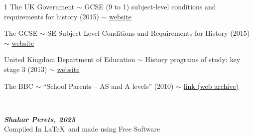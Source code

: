 \documentclass[12pt]{article}
\begin{document}
\begin{thebibliography}{1}
		 The UK Government $\sim$ GCSE (9 to 1) subject-level conditions and requirements for history (2015) $\sim$ \href{https://www.gov.uk/government/publications/gcse-9-to-1-subject-level-conditions-and-requirements-for-history}{website}
		
		 The GCSE $\sim$ SE Subject Level Conditions and Requirements for History (2015) $\sim$ \href{https://assets.publishing.service.gov.uk/media/5a74dfa9ed915d502d6cbae0/gcse-subject-level-conditions-and-requirements-for-history.pdf}{website}
		
		 United Kingdom Department of Education $\sim$ History programs of study: key stage 3 (2013) $\sim$ \href{https://assets.publishing.service.gov.uk/media/5a7c66d740f0b626628abcdd/SECONDARY_national_curriculum_-_History.pdf}{website}
		
		 The BBC $\sim$ ``School Parents -- AS and A levels'' (2010) $\sim$ \href{https://web.archive.org/web/20100728135656/http://www.bbc.co.uk/schools/parents/alevels/}{link (web archive)}
		
	\end{thebibliography}
	
	{\large\dotfill\normalsize \\ \vfil {\begin{center}
				{\textbf{\textit{Shahar Perets, 2025}} \\
					\scriptsize Compiled In {\LaTeX}\ and made using Free Software}
		\end{center}} \vfil	}
	
	
	
	
\end{document}
